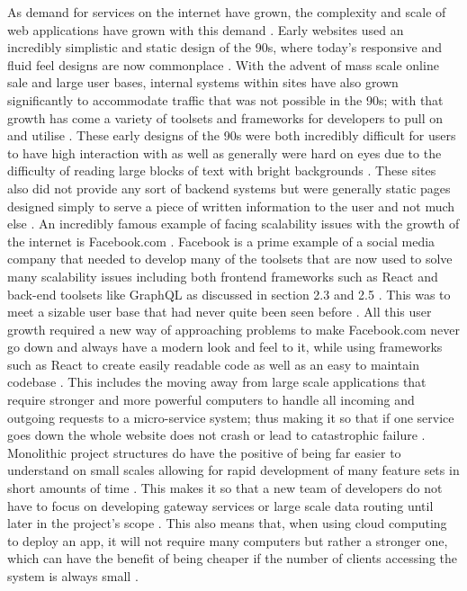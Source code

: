 As demand for services on the internet have grown, the complexity and scale of web applications have grown with this demand \cite{Ivory_Megraw_2005}. Early websites used an incredibly simplistic and static design of the 90s, where today’s responsive and fluid feel designs are now commonplace \cite{Chen_Tang_Wang_Zhao_Guo_2016}. With the advent of mass scale online sale and large user bases, internal systems within sites have also grown significantly to accommodate traffic that was not possible in the 90s; with that growth has come a variety of toolsets and frameworks for developers to pull on and utilise \cite{Chen_Tang_Wang_Zhao_Guo_2016, Abdullah_Zeki_2014, Ivory_Megraw_2005}. These early designs of the 90s were both incredibly difficult for users to have high interaction with as well as generally were hard on eyes due to the difficulty of reading large blocks of text with bright backgrounds \cite{Chen_Tang_Wang_Zhao_Guo_2016}. These sites also did not provide any sort of backend systems but were generally static pages designed simply to serve a piece of written information to the user and not much else \cite{Ivory_Megraw_2005}.
\newline
\newline
An incredibly famous example of facing scalability issues with the growth of the internet is Facebook.com \cite{Abdullah_Zeki_2014, Stolberg_2009}. Facebook is a prime example of a social media company that needed to develop many of the toolsets that are now used to solve many scalability issues including both frontend frameworks such as React and back-end toolsets like GraphQL as discussed in section 2.3 and 2.5 \cite{Abdullah_Zeki_2014, Brito_Valente_2020, Xu_2021}. This was to meet a sizable user base that had never quite been seen before \cite{Chen1_Ji1_Fan1_Zhan2_2017}. All this user growth required a new way of approaching problems to make Facebook.com never go down and always have a modern look and feel to it, while using frameworks such as React to create easily readable code as well as an easy to maintain codebase \cite{Chen1_Ji1_Fan1_Zhan2_2017}. This includes the moving away from large scale applications that require stronger and more powerful computers to handle all incoming and outgoing requests to a micro-service system; thus making it so that if one service goes down the whole website does not crash or lead to catastrophic failure \cite{Villamizar_Garcés_Castro_Salamanca_Casallas_2017}.
\newline
\newline
Monolithic project structures do have the positive of being far easier to understand on small scales allowing for rapid development of many feature sets in short amounts of time \cite{Combe_Martin_Di_Pietro_2016, Villamizar_Garcés_Castro_Salamanca_Casallas_2017}. This makes it so that a new team of developers do not have to focus on developing gateway services or large scale data routing until later in the project's scope \cite{Villamizar_Garcés_Castro_Salamanca_Casallas_2017}. This also means that, when using cloud computing to deploy an app, it will not require many computers but rather a stronger one, which can have the benefit of being cheaper if the number of clients accessing the system is always small \cite{Villamizar_Garcés_Castro_Salamanca_Casallas_2017}.

